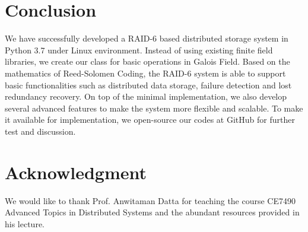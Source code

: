 \documentclass[journal]{IEEEtran}
\begin{document}
\section{Conclusion}
\label{sec6}
We have successfully developed a RAID-6 based distributed storage system in Python 3.7 under Linux environment. Instead of using existing finite field libraries, we create our class for basic operations in Galois Field. Based on the mathematics of Reed-Solomen Coding, the RAID-6 system is able to support basic functionalities such as distributed data storage, failure detection and lost redundancy recovery. On top of the minimal implementation, we also develop several advanced features to make the system more flexible and scalable. To make it available for implementation, we open-source our codes at GitHub for further test and discussion.


\section*{Acknowledgment}
We would like to thank Prof. Anwitaman Datta for teaching the course CE7490 Advanced Topics in Distributed Systems and the abundant resources provided in his lecture.

\end{document}
